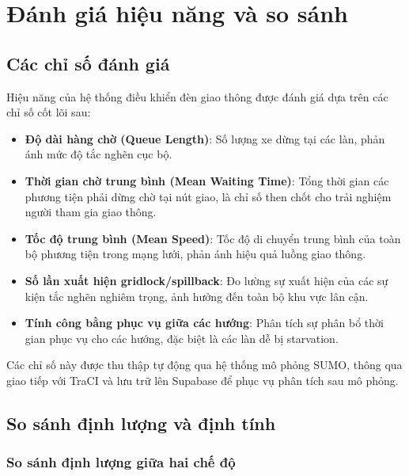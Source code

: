 \chapter{Đánh giá hiệu năng và so sánh}

\section{Các chỉ số đánh giá}

Hiệu năng của hệ thống điều khiển đèn giao thông được đánh giá dựa trên các chỉ số cốt lõi sau:
\begin{itemize}
    \item \textbf{Độ dài hàng chờ (Queue Length)}: Số lượng xe dừng tại các làn, phản ánh mức độ tắc nghẽn cục bộ.
    \item \textbf{Thời gian chờ trung bình (Mean Waiting Time)}: Tổng thời gian các phương tiện phải dừng chờ tại nút giao, là chỉ số then chốt cho trải nghiệm người tham gia giao thông.
    \item \textbf{Tốc độ trung bình (Mean Speed)}: Tốc độ di chuyển trung bình của toàn bộ phương tiện trong mạng lưới, phản ánh hiệu quả luồng giao thông.
    \item \textbf{Số lần xuất hiện gridlock/spillback}: Đo lường sự xuất hiện của các sự kiện tắc nghẽn nghiêm trọng, ảnh hưởng đến toàn bộ khu vực lân cận.
    \item \textbf{Tính công bằng phục vụ giữa các hướng}: Phân tích sự phân bổ thời gian phục vụ cho các hướng, đặc biệt là các làn dễ bị starvation.
\end{itemize}

Các chỉ số này được thu thập tự động qua hệ thống mô phỏng SUMO, thông qua giao tiếp với TraCI và lưu trữ lên Supabase để phục vụ phân tích sau mô phỏng.

\section{So sánh định lượng và định tính}

\subsection{So sánh định lượng giữa hai chế độ}

